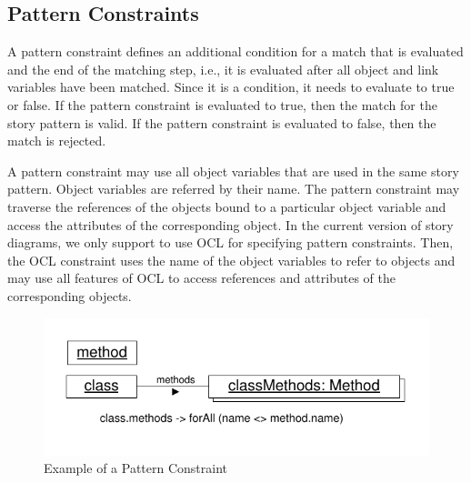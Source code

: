 {
\subsection{Pattern Constraints}
\label{sec:PatternConstraints}

A pattern constraint defines an additional condition for a match that is evaluated and the end of the matching step, i.e., it is evaluated after all object and link variables have been matched. Since it is a condition, it needs to evaluate to true or false. If the pattern constraint is evaluated to true, then the match for the story pattern is valid. If the pattern constraint is evaluated to false, then the match is rejected.

A pattern constraint may use all object variables that are used in the same story pattern. Object variables are referred by their name. The pattern constraint may traverse the references of the objects bound to a particular object variable and access the attributes of the corresponding object. In the current version of story diagrams, we only support to use OCL for specifying pattern constraints. Then, the OCL constraint uses the name of the object variables to refer to objects and may use all features of OCL to access references and attributes of the corresponding objects.

\begin{figure}[htbp]
\center
\includegraphics[width=0.6\columnwidth]{figures/PatternConstraint}
\caption{Example of a Pattern Constraint}
\label{fig:patternConstraint}
\end{figure}


}
